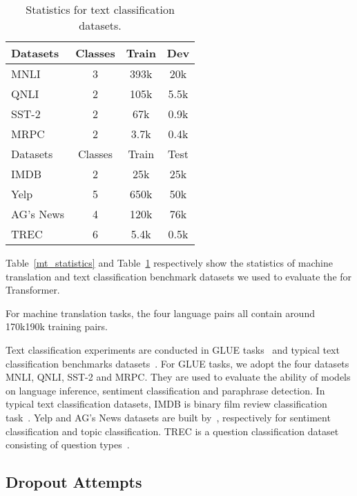 \documentclass[11pt]{article}
\begin{document}
\begin{table}[!tbp]
\centering
{
		\centering
		\begin{tabular}{l | c c c}
			\hline
            Datasets & Classes & Train & Dev\\
            \hline
            MNLI & 3 & 393k & 20k \\
            QNLI & 2 & 105k & 5.5k \\
            SST-2 & 2 & 67k & 0.9k \\
            MRPC & 2 & 3.7k & 0.4k \\
			\hline
		    Datasets & Classes & Train & Test\\
			\hline
			IMDB & 2 & 25k & 25k\\
			Yelp & 5 & 650k & 50k\\
			AG's News & 4 & 120k & 76k\\
			TREC & 6 & 5.4k & 0.5k\\
			\hline
	\end{tabular} }
	\caption{Statistics for text classification datasets.} 
	\label{cls_statistics}
\end{table}


Table~\ref{mt_statistics} and Table~\ref{cls_statistics} respectively show the statistics of machine translation and text classification benchmark datasets we used to evaluate the  for Transformer.

For machine translation tasks, the four language pairs all contain around 170k190k training pairs. 


Text classification experiments are conducted in GLUE tasks~\cite{DBLP:conf/iclr/WangSMHLB19} and typical text classification benchmarks datasets~\cite{DBLP:conf/trec/VoorheesT99,DBLP:conf/acl/MaasDPHNP11,DBLP:conf/nips/ZhangZL15}. For GLUE tasks, we adopt the four datasets MNLI, QNLI, SST-2 and MRPC. They are used to evaluate the ability of models on language inference, sentiment classification and paraphrase detection. In typical text classification datasets, IMDB is binary film review classification task~\cite{DBLP:conf/acl/MaasDPHNP11}. Yelp and AG's News datasets are built by~\cite{DBLP:conf/nips/ZhangZL15}, respectively for sentiment classification and topic classification. TREC is a question classification dataset consisting of  question types~\cite{DBLP:conf/trec/VoorheesT99}.


\subsection{Dropout Attempts}
\label{sec:appendix_feature_dropout}
\end{document}
